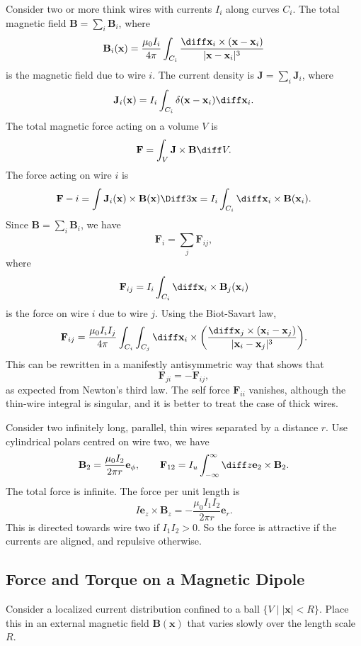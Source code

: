 \documentclass[12pt]{article}
\begin{document}
Consider two or more think wires with currents $I_i$ along curves $C_i$. The total magnetic field $\mathbf{B}= \sum_i \mathbf{B}_i$, where
\[
\mathbf{B}_i(\mathbf{x}) = \frac{\mu_0 I_i}{4 \pi} \int_{C_i} \frac{\diff \mathbf{x}_i \times (\mathbf{x} - \mathbf{x}_i)}{|\mathbf{x} - \mathbf{x}_i|^3}
\]
is the magnetic field due to wire $i$. The current density is $\mathbf{J} = \sum_i \mathbf{J}_i$, where
\[
\mathbf{J}_i(\mathbf{x}) = I_i \int_{C_i}\delta(\mathbf{x} - \mathbf{x}_i) \diff \mathbf{x}_i
.\]
The total magnetic force acting on a volume $V$ is
\[
\mathbf{F} = \int_{V} \mathbf{J} \times \mathbf{B} \diff V
.\]
The force acting on wire $i$ is
\[
\mathbf{F}-i = \int \mathbf{J}_i(\mathbf{x}) \times \mathbf{B}(\mathbf{x}) \Diff3 \mathbf{x} = I_i \int_{C_i} \diff \mathbf{x}_i \times \mathbf{B}(\mathbf{x}_i)
.\]
Since $\mathbf{B} = \sum_i \mathbf{B}_i$, we have
\[
\mathbf{F}_i = \sum_{j} \mathbf{F}_{ij}
,\]
where
\[
\mathbf{F}_{ij} = I_i \int_{C_i} \diff \mathbf{x}_i \times \mathbf{B}_j(\mathbf{x}_i)
\]
is the force on wire $i$ due to wire $j$. Using the Biot-Savart law,
\[
\mathbf{F}_{ij} = \frac{\mu_0 I_i I_j}{4 \pi} \int_{C_i} \int_{C_j} \diff \mathbf{x}_i \times \biggl( \frac{\diff \mathbf{x}_j \times (\mathbf{x}_i - \mathbf{x}_j)}{|\mathbf{x}_i - \mathbf{x}_j|^3} \biggr)
.\]
This can be rewritten in a manifestly antisymmetric way that shows that
\[
\mathbf{F}_{ji} = - \mathbf{F}_{ij}
,\]
as expected from Newton's third law. The self force $\mathbf{F}_{ii}$ vanishes, although the thin-wire integral is singular, and it is better to treat the case of thick wires.

Consider two infinitely long, parallel, thin wires separated by a distance $r$. Use cylindrical polars centred on wire two, we have
\[
\mathbf{B}_2 = \frac{\mu_0 I_2}{2 \pi r} \mathbf{e}_{\phi}, \qquad \mathbf{F}_{12} = I_u \int_{-\infty}^{\infty} \diff z \mathbf{e}_2 \times \mathbf{B}_2
.\]
The total force is infinite. The force per unit length is
\[
I \mathbf{e}_z \times \mathbf{B}_z = - \frac{\mu_0 I_1 I_2}{2 \pi r} \mathbf{e}_r
.\]
This is directed towards wire two if $I_1I_2 > 0$. So the force is attractive if the currents are aligned, and repulsive otherwise.

\subsection{Force and Torque on a Magnetic Dipole}

Consider a localized current distribution confined to a ball $\{V \mid |\mathbf{x}| < R\}$. Place this in an external magnetic field $\mathbf{B}(\mathbf{x})$ that varies slowly over the length scale $R$.
\end{document}
